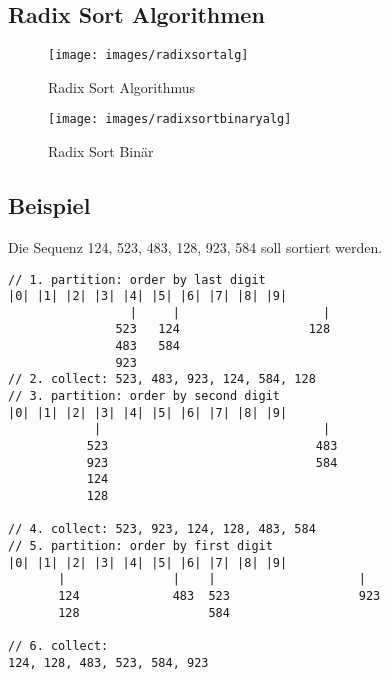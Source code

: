 \subsection{Radix Sort Algorithmen}
\begin{figure}[h!]
	\centering
	\begin{minipage}[t]{0.4\textwidth}
		\centering
		\texttt{[image: images/radixsortalg]}
		\caption{Radix Sort Algorithmus}
		\label{fig:radixsortalg}
	\end{minipage}
	\begin{minipage}[t]{0.4\textwidth}
		\centering
		\texttt{[image: images/radixsortbinaryalg]}
		\caption{Radix Sort Binär}
		\label{fig:radixsortbinary}
	\end{minipage}
\end{figure}
\clearpage

\subsection{Beispiel}
Die Sequenz 124, 523, 483, 128, 923, 584 soll sortiert werden.
\begin{lstlisting}
// 1. partition: order by last digit
|0| |1| |2| |3| |4| |5| |6| |7| |8| |9|
				 |     |           	        |
			   523   124           		  128
			   483   584 
			   923
// 2. collect: 523, 483, 923, 124, 584, 128
// 3. partition: order by second digit
|0| |1| |2| |3| |4| |5| |6| |7| |8| |9|
		    |                               |
		   523                             483
		   923                             584
		   124
		   128
		
// 4. collect: 523, 923, 124, 128, 483, 584
// 5. partition: order by first digit
|0| |1| |2| |3| |4| |5| |6| |7| |8| |9|
	   |               |    |                    |
	   124             483  523                  923
	   128                  584

// 6. collect: 
124, 128, 483, 523, 584, 923
\end{lstlisting}

\clearpage

